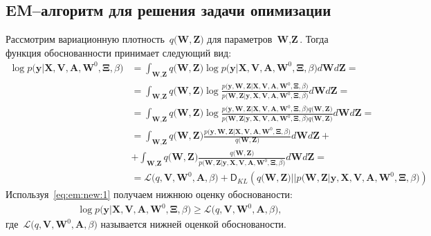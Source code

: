 \subsection{EM--алгоритм для решения задачи опимизации}
Рассмотрим вариационную плотность~$q\bigr(\textbf{W}, \textbf{Z}\bigr)$ для параметров~$\textbf{W}, \textbf{Z}$. Тогда функция обоснованности принимает следующий вид:
\[
\label{eq:em:new:1}
\begin{aligned}
\log p\bigr(\mathbf{y}|\mathbf{X}, \mathbf{V}, \textbf{A}, \textbf{W}^{0}, \bm{\Xi}, \beta\bigr) &= \int_{\textbf{W}, \textbf{Z}} q\bigr(\textbf{W}, \textbf{Z}\bigr) \log p\bigr(\mathbf{y}|\mathbf{X}, \mathbf{V}, \textbf{A}, \textbf{W}^{0}, \bm{\Xi}, \beta\bigr)d\textbf{W}d\textbf{Z} =\\
&= \int_{\textbf{W}, \textbf{Z}} q\bigr(\textbf{W}, \textbf{Z}\bigr)\log \frac{p\bigr(\mathbf{y}, \textbf{W}, \textbf{Z}|\mathbf{X}, \mathbf{V}, \textbf{A}, \textbf{W}^{0}, \bm{\Xi}, \beta\bigr)}{p\bigr(\textbf{W}, \textbf{Z}|\mathbf{y}, \mathbf{X}, \mathbf{V}, \textbf{A}, \textbf{W}^{0}, \bm{\Xi}, \beta\bigr)}d\textbf{W}d\textbf{Z}=\\
&= \int_{\textbf{W}, \textbf{Z}} q\bigr(\textbf{W}, \textbf{Z}\bigr)\log \frac{p\bigr(\mathbf{y}, \textbf{W}, \textbf{Z}|\mathbf{X}, \mathbf{V}, \textbf{A}, \textbf{W}^{0}, \bm{\Xi}, \beta\bigr)q\bigr(\textbf{W}, \textbf{Z}\bigr)}{p\bigr(\textbf{W}, \textbf{Z}|\mathbf{y}, \mathbf{X}, \mathbf{V}, \textbf{A}, \textbf{W}^{0}, \bm{\Xi}, \beta\bigr)q\bigr(\textbf{W}, \textbf{Z}\bigr)}d\textbf{W}d\textbf{Z}=\\
&= \int_{\textbf{W}, \textbf{Z}} q\bigr(\textbf{W}, \textbf{Z}\bigr)\frac{p\bigr(\mathbf{y}, \textbf{W}, \textbf{Z}|\mathbf{X}, \mathbf{V}, \textbf{A}, \textbf{W}^{0}, \bm{\Xi}, \beta\bigr)}{q\bigr(\textbf{W}, \textbf{Z}\bigr)}d\textbf{W}d\textbf{Z}+\\
&+\int_{\textbf{W}, \textbf{Z}} q\bigr(\textbf{W}, \textbf{Z}\bigr)\frac{q\bigr(\textbf{W}, \textbf{Z}\bigr)}{p\bigr(\textbf{W}, \textbf{Z}|\mathbf{y}, \mathbf{X}, \mathbf{V}, \textbf{A}, \textbf{W}^{0}, \bm{\Xi}, \beta\bigr)}d\textbf{W}d\textbf{Z}=\\
&=\mathcal{L}\bigr(q, \textbf{V}, \textbf{W}^{0}, \textbf{A}, \beta\bigr)+\mathsf{D}_{KL}\left(q\bigr(\textbf{W}, \textbf{Z}\bigr)||p\bigr(\textbf{W}, \textbf{Z}|\mathbf{y}, \mathbf{X}, \mathbf{V}, \textbf{A}, \textbf{W}^{0}, \bm{\Xi}, \beta\bigr)\right)
\end{aligned}
\]
Используя~\eqref{eq:em:new:1} получаем нижнюю оценку обоснованости:
\[
\label{eq:em:new:2}
\begin{aligned}
\log p\bigr(\mathbf{y}|\mathbf{X}, \mathbf{V}, \textbf{A}, \textbf{W}^{0}, \bm{\Xi}, \beta\bigr)\geq \mathcal{L}\bigr(q, \textbf{V}, \textbf{W}^{0}, \textbf{A}, \beta\bigr),
\end{aligned}
\]
где~$\mathcal{L}\bigr(q, \textbf{V}, \textbf{W}^{0}, \textbf{A}, \beta\bigr)$ называется нижней оценкой обоснованости.

